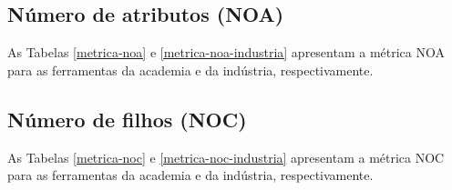 
\subsection{Número de atributos (NOA)}

As Tabelas \ref{metrica-noa} e \ref{metrica-noa-industria} apresentam a
métrica NOA para as ferramentas da academia e da indústria, respectivamente.



\subsection{Número de filhos (NOC)}

As Tabelas \ref{metrica-noc} e \ref{metrica-noc-industria} apresentam a
métrica NOC para as ferramentas da academia e da indústria, respectivamente.


